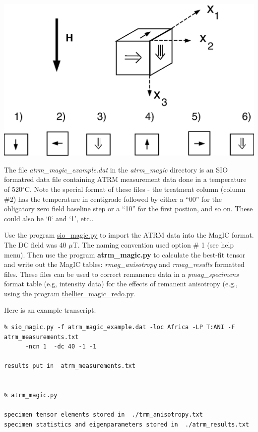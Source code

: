 \documentclass[11pt]{book}
\begin{document}
{{{\includegraphics[width=15cm]{EPSfiles/atrm_meas.eps}

The file {\it atrm\_magic\_example.dat} in the {\it atrm\_magic} directory is an SIO formatred data file containing ATRM measurement data done in a temperature of 520$^{\circ}$C.   Note the special format of these files - the treatment column (column \#2) has the temperature in centigrade followed by either a ``00'' for the obligatory zero field baseline step or a ``10'' for the first postion, and so on.  These could also be `0` and `1', etc..    
 
Use the program \href{#sio_magic.py}{sio\_magic.py} to import the ATRM data  into the MagIC format.  The DC field was 40 $\mu$T.  The naming convention used option \# 1 (see help menu). 
Then use the program {\bf atrm\_magic.py} to calculate the best-fit tensor and write out the MagIC tables: {\it rmag\_anisotropy} and {\it rmag\_results} formatted files.   These files can be used to correct remanence data in a {\it pmag\_specimens} format table (e.g, intensity data) for the effects of remanent anisotropy (e.g., using the program \href{#thellier_magic.py}{thellier\_magic\_redo.py}.

Here is an example transcript:

\begin{verbatim}
% sio_magic.py -f atrm_magic_example.dat -loc Africa -LP T:ANI -F atrm_measurements.txt 
      -ncn 1  -dc 40 -1 -1

results put in  atrm_measurements.txt


% atrm_magic.py 

specimen tensor elements stored in  ./trm_anisotropy.txt
specimen statistics and eigenparameters stored in  ./atrm_results.txt
\end{verbatim}

}}}
\end{document}
